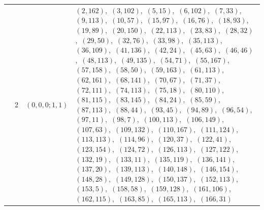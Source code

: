 \documentclass[11pt]{article}
\begin{document}
\begin{longtable}{@{}rrl>{\raggedright\arraybackslash}p{}@{}}
\addlinespace[3pt]
13 & 2 & $(0,0,0;1,1)$ & $(2,162)$,\allowbreak\ $(3,102)$,\allowbreak\ $(5,15)$,\allowbreak\ $(6,102)$,\allowbreak\ $(7,33)$,\allowbreak\ $(9,113)$,\allowbreak\ $(10,57)$,\allowbreak\ $(15,97)$,\allowbreak\ $(16,76)$,\allowbreak\ $(18,93)$,\allowbreak\ $(19,89)$,\allowbreak\ $(20,150)$,\allowbreak\ $(22,113)$,\allowbreak\ $(23,83)$,\allowbreak\ $(28,32)$,\allowbreak\ $(29,50)$,\allowbreak\ $(32,76)$,\allowbreak\ $(33,98)$,\allowbreak\ $(35,113)$,\allowbreak\ $(36,109)$,\allowbreak\ $(41,136)$,\allowbreak\ $(42,24)$,\allowbreak\ $(45,63)$,\allowbreak\ $(46,46)$,\allowbreak\ $(48,113)$,\allowbreak\ $(49,135)$,\allowbreak\ $(54,71)$,\allowbreak\ $(55,167)$,\allowbreak\ $(57,158)$,\allowbreak\ $(58,50)$,\allowbreak\ $(59,163)$,\allowbreak\ $(61,113)$,\allowbreak\ $(62,161)$,\allowbreak\ $(68,141)$,\allowbreak\ $(70,67)$,\allowbreak\ $(71,37)$,\allowbreak\ $(72,111)$,\allowbreak\ $(74,113)$,\allowbreak\ $(75,18)$,\allowbreak\ $(80,110)$,\allowbreak\ $(81,115)$,\allowbreak\ $(83,145)$,\allowbreak\ $(84,24)$,\allowbreak\ $(85,59)$,\allowbreak\ $(87,113)$,\allowbreak\ $(88,44)$,\allowbreak\ $(93,45)$,\allowbreak\ $(94,89)$,\allowbreak\ $(96,54)$,\allowbreak\ $(97,11)$,\allowbreak\ $(98,7)$,\allowbreak\ $(100,113)$,\allowbreak\ $(106,149)$,\allowbreak\ $(107,63)$,\allowbreak\ $(109,132)$,\allowbreak\ $(110,167)$,\allowbreak\ $(111,124)$,\allowbreak\ $(113,113)$,\allowbreak\ $(114,96)$,\allowbreak\ $(120,37)$,\allowbreak\ $(122,41)$,\allowbreak\ $(123,154)$,\allowbreak\ $(124,72)$,\allowbreak\ $(126,113)$,\allowbreak\ $(127,122)$,\allowbreak\ $(132,19)$,\allowbreak\ $(133,11)$,\allowbreak\ $(135,119)$,\allowbreak\ $(136,141)$,\allowbreak\ $(137,20)$,\allowbreak\ $(139,113)$,\allowbreak\ $(140,148)$,\allowbreak\ $(146,154)$,\allowbreak\ $(148,28)$,\allowbreak\ $(149,128)$,\allowbreak\ $(150,137)$,\allowbreak\ $(152,113)$,\allowbreak\ $(153,5)$,\allowbreak\ $(158,58)$,\allowbreak\ $(159,128)$,\allowbreak\ $(161,106)$,\allowbreak\ $(162,115)$,\allowbreak\ $(163,85)$,\allowbreak\ $(165,113)$,\allowbreak\ $(166,31)$\\

\end{longtable}
\end{document}

